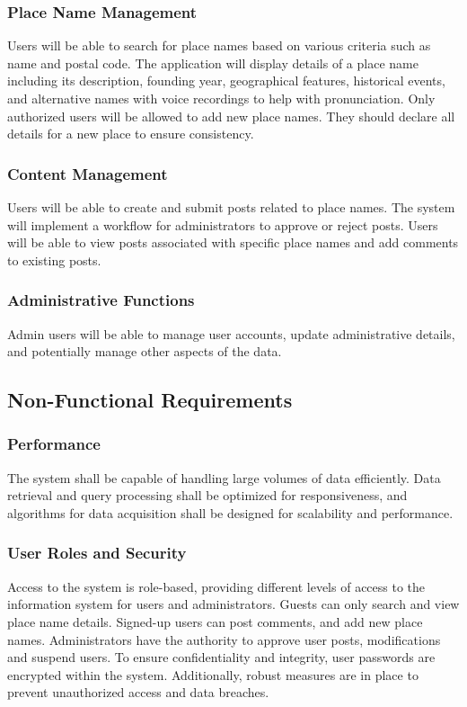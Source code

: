 \subsubsection{Place Name Management}
Users will be able to search for place names based on various criteria such as name and postal code. The application will display details of a place name including its description, founding year, geographical features, historical events, and alternative names with voice recordings to help with pronunciation. Only authorized users will be allowed to add new place names. They should declare all details for a new place to ensure consistency.

\subsubsection{Content Management}
Users will be able to create and submit posts related to place names. The system will implement a workflow for administrators to approve or reject posts. Users will be able to view posts associated with specific place names and add comments to existing posts.

\subsubsection{Administrative Functions}
Admin users will be able to manage user accounts, update administrative details, and potentially manage other aspects of the data.

\subsection{Non-Functional Requirements}

\subsubsection{Performance}
The system shall be capable of handling large volumes of data efficiently. Data retrieval and query processing shall be optimized for responsiveness, and algorithms for data acquisition shall be designed for scalability and performance.

\subsubsection{User Roles and Security}
Access to the system is role-based, providing different levels of access to the information system for users and administrators. Guests can only search and view place name details. Signed-up users can post comments, and add new place names. Administrators have the authority to approve user posts, modifications and suspend users. To ensure confidentiality and integrity, user passwords are encrypted within the system. Additionally, robust measures are in place to prevent unauthorized access and data breaches.

